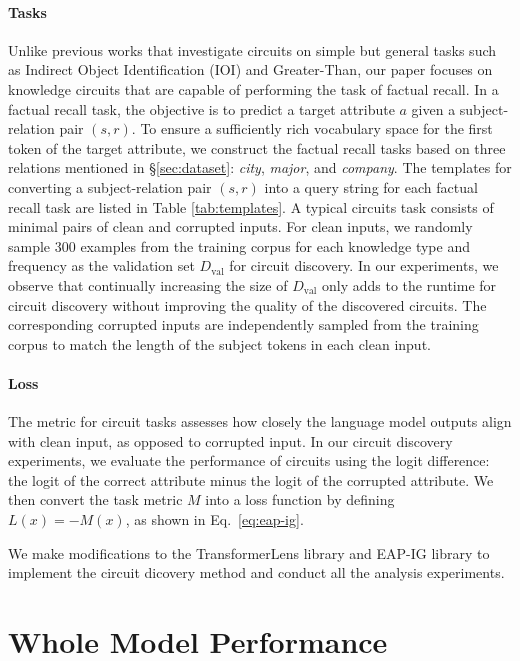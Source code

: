 \paragraph{Tasks}
Unlike previous works that investigate circuits on simple but general tasks such as Indirect Object Identification (IOI) and Greater-Than, our paper focuses on knowledge circuits that are capable of performing the task of factual recall.
In a factual recall task, the objective is to predict a target attribute $a$ given a subject-relation pair $(s, r)$.
To ensure a sufficiently rich vocabulary space for the first token of the target attribute, we construct the factual recall tasks based on three relations mentioned in \S\ref{sec:dataset}: \textit{city}, \textit{major}, and \textit{company}.
The templates for converting a subject-relation pair $(s, r)$ into a query string for each factual recall task are listed in Table \ref{tab:templates}.
A typical circuits task consists of minimal pairs of clean and corrupted inputs.
For clean inputs, we randomly sample 300 examples from the training corpus for each knowledge type and frequency as the validation set $D_{\text{val}}$ for circuit discovery.
In our experiments, we observe that continually increasing the size of $D_{\text{val}}$ only adds to the runtime for circuit discovery without improving the quality of the discovered circuits.
The corresponding corrupted inputs are independently sampled from the training corpus to match the length of the subject tokens in each clean input.

\paragraph{Loss}
The metric for circuit tasks assesses how closely the language model outputs align with clean input, as opposed to corrupted input.
In our circuit discovery experiments, we evaluate the performance of circuits using the logit difference: the logit of the correct attribute minus the logit of the corrupted attribute.
We then convert the task metric $M$ into a loss function by defining $L(x)=-M(x)$, as shown in Eq.~\ref{eq:eap-ig}.

We make modifications to the TransformerLens library \citep{nanda2022transformerlens} and EAP-IG library \citep{eap-ig} to implement the circuit dicovery method and conduct all the analysis experiments.

\section{Whole Model Performance}
\label{app:performance}

